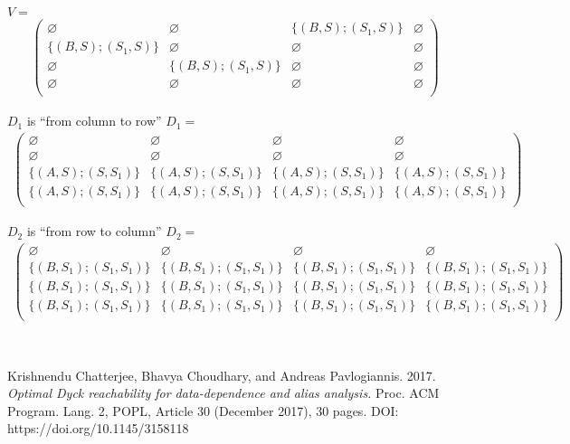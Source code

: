 \documentclass[12pt]{article}  %
\theoremstyle{definition}
\theoremstyle{remark}
\begin{document}
$V=$
\begin{align*}
\begin{pmatrix}
\varnothing       & \varnothing & \{(B,S);(S_1,S)\} & \varnothing       \\
\{(B,S);(S_1,S)\} & \varnothing & \varnothing & \varnothing \\
\varnothing       & \{(B,S);(S_1,S)\} & \varnothing & \varnothing  \\
\varnothing       & \varnothing & \varnothing & \varnothing  \\
\end{pmatrix}
\end{align*}

$D_1$ is ``from column to row''
$D_1 = $
\begin{align*}
\begin{pmatrix}
\varnothing       & \varnothing & \varnothing & \varnothing       \\
\varnothing       & \varnothing & \varnothing & \varnothing       \\
\{(A,S);(S,S_1)\}       & \{(A,S);(S,S_1)\} & \{(A,S);(S,S_1)\} & \{(A,S);(S,S_1)\} \\
\{(A,S);(S,S_1)\}       & \{(A,S);(S,S_1)\} & \{(A,S);(S,S_1)\} & \{(A,S);(S,S_1)\} \\
\end{pmatrix}
\end{align*}

$D_2$ is ``from row to column''
$D_2 = $
\begin{align*}
\begin{pmatrix}
\varnothing       & \varnothing & \varnothing & \varnothing       \\
\{(B,S_1);(S_1,S_1)\}       & \{(B,S_1);(S_1,S_1)\} & \{(B,S_1);(S_1,S_1)\} & \{(B,S_1);(S_1,S_1)\}       \\
\{(B,S_1);(S_1,S_1)\}       & \{(B,S_1);(S_1,S_1)\} & \{(B,S_1);(S_1,S_1)\} & \{(B,S_1);(S_1,S_1)\}       \\
\{(B,S_1);(S_1,S_1)\}       & \{(B,S_1);(S_1,S_1)\} & \{(B,S_1);(S_1,S_1)\} & \{(B,S_1);(S_1,S_1)\}       \\
\end{pmatrix}
\end{align*}




\

\begin{thebibliography}{9}

Krishnendu Chatterjee, Bhavya Choudhary, and Andreas Pavlogiannis. 
2017. 
\emph{Optimal Dyck reachability for data-dependence and alias analysis.}
Proc. ACM Program. Lang. 2, POPL, Article 30 (December 2017), 30 pages. DOI: 
https://doi.org/10.1145/3158118




\end{thebibliography}
\end{document}
